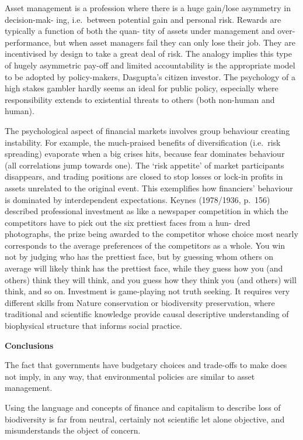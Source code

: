 \documentclass[
]{book}
\begin{document}
Asset management is a profession where there is a huge gain/lose asymmetry in decision-mak-
ing, i.e.~between potential gain and personal risk. Rewards are typically a function of both the quan-
tity of assets under management and over-performance, but when asset managers fail they can only
lose their job. They are incentivised by design to take a great deal of risk. The analogy implies this
type of hugely asymmetric pay-off and limited accountability is the appropriate model to be
adopted by policy-makers, Dasgupta's citizen investor. The psychology of a high stakes gambler
hardly seems an ideal for public policy, especially where responsibility extends to existential threats
to others (both non-human and human).

The psychological aspect of financial markets involves group behaviour creating instability. For
example, the much-praised benefits of diversification (i.e.~risk spreading) evaporate when a big crises
hits, because fear dominates behaviour (all correlations jump towards one). The `risk appetite' of
market participants disappears, and trading positions are closed to stop losses or lock-in profits in
assets unrelated to the original event. This exemplifies how financiers' behaviour is dominated by
interdependent expectations. Keynes (1978/1936, p.~156) described professional investment as like
a newspaper competition in which the competitors have to pick out the six prettiest faces from a hun-
dred photographs, the prize being awarded to the competitor whose choice most nearly corresponds
to the average preferences of the competitors as a whole. You win not by judging who has the prettiest
face, but by guessing whom others on average will likely think has the prettiest face, while they guess
how you (and others) think they will think, and you guess how they think you (and others) will think,
and so on. Investment is game-playing not truth seeking. It requires very different skills from Nature
conservation or biodiversity preservation, where traditional and scientific knowledge provide causal
descriptive understanding of biophysical structure that informs social practice.

\textbf{Conclusions}

The fact that governments have budgetary choices and trade-offs to make does not imply, in any
way, that environmental policies are similar to asset management.

Using the language and concepts of finance and
capitalism to describe loss of biodiversity is far from neutral,
certainly not scientific let alone objective, and misunderstands the object of concern.
\end{document}
